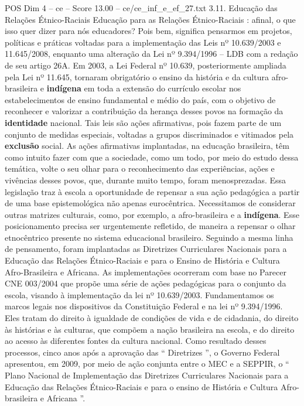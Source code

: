 \begin{textsample}{POS Dim 4 – ce – Score 13.00 – ce/ce\_inf\_e\_ef\_27.txt}  \label{ex:f4_pos_134}
3.11.
Educação das Relações Étnico-Raciais Educação para as Relações Étnico-Raciais : afinal, o que isso quer dizer para nós educadores?
Pois bem, significa pensarmos em projetos, políticas e práticas voltadas para a implementação das Leis nº 10.639/2003 e 11.645/2008, enquanto uma alteração da Lei nº 9.394/1996 – LDB com a redação de seu artigo 26A.
Em 2003, a Lei Federal nº 10.639, posteriormente ampliada pela Lei nº 11.645, tornaram obrigatório o ensino da história e da cultura afro-brasileira e \textbf{indígena} em toda a extensão do currículo escolar nos estabelecimentos de ensino fundamental e médio do país, com o objetivo de reconhecer e valorizar a contribuição da herança desses povos na formação da \textbf{identidade} nacional.
Tais leis são ações afirmativas, pois fazem parte de um conjunto de medidas especiais, voltadas a grupos discriminados e vitimados pela \textbf{exclusão} social.
As ações afirmativas implantadas, na educação brasileira, têm como intuito fazer com que a sociedade, como um todo, por meio do estudo dessa temática, volte o seu olhar para o reconhecimento das experiências, ações e vivências desses povos, que, durante muito tempo, foram menosprezadas.
Essa legislação traz à escola a oportunidade de repensar a sua ação pedagógica a partir de uma base epistemológica não apenas eurocêntrica.
Necessitamos de considerar outras matrizes culturais, como, por exemplo, a afro-brasileira e a \textbf{indígena}.
Esse posicionamento precisa ser urgentemente refletido, de maneira a repensar o olhar etnocêntrico presente no sistema educacional brasileiro.
Seguindo a mesma linha de pensamento, foram implantadas as Diretrizes Curriculares Nacionais para a Educação das Relações Étnico-Raciais e para o Ensino de História e Cultura Afro-Brasileira e Africana.
As implementações ocorreram com base no Parecer CNE 003/2004 que propõe uma série de ações pedagógicas para o conjunto da escola, visando à implementação da lei nº 10.639/2003.
Fundamentamos os marcos legais nos dispositivos da Constituição Federal e na lei nº 9.394/1996.
Eles tratam do direito à igualdade de condições de vida e de cidadania, do direito às histórias e às culturas, que compõem a nação brasileira na escola, e do direito ao acesso às diferentes fontes da cultura nacional.
Como resultado desses processos, cinco anos após a aprovação das “ Diretrizes ”, o Governo Federal apresentou, em 2009, por meio de ação conjunta entre o MEC e a SEPPIR, o “ Plano Nacional de Implementação das Diretrizes Curriculares Nacionais para a Educação das Relações Étnico-Raciais e para o ensino de História e Cultura Afro-brasileira e Africana ”.

\end{textsample}
